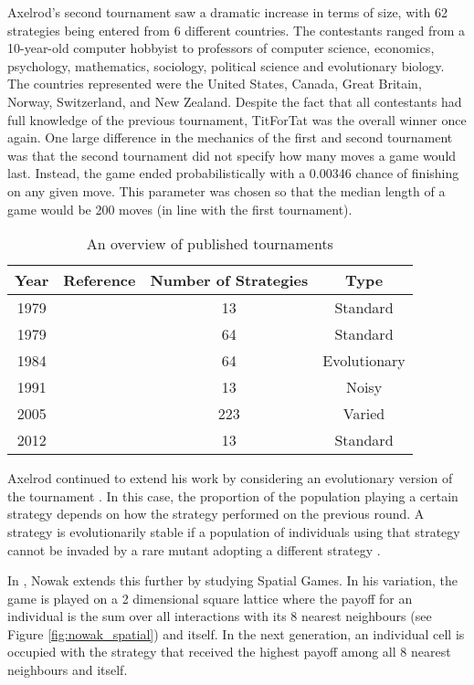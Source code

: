 Axelrod's second tournament \cite{Axelrod1980b} saw a dramatic increase in terms of size, with 62 strategies being entered from 6 different countries.
The contestants ranged from a 10-year-old computer hobbyist to professors of computer science, economics, psychology, mathematics, sociology, political science and evolutionary biology.
The countries represented were the United States, Canada, Great Britain, Norway, Switzerland, and New Zealand.
Despite the fact that all contestants had full knowledge of the previous tournament, TitForTat was the overall winner once again.
One large difference in the mechanics of the first and second tournament was that the second tournament did not specify how many moves a game would last.
Instead, the game ended probabilistically with a 0.00346 chance of finishing on any given move.
This parameter was chosen so that the median length of a game would be 200 moves (in line with the first tournament).

\begin{table}[htbp]
\centering
\begin{tabular}{c c c c}
\toprule
Year & Reference & Number of Strategies & Type\\
\midrule
1979 & \cite{Axelrod1980a} & 13 & Standard\\
1979 & \cite{Axelrod1980b} & 64 & Standard\\
1984 & \cite{Axelrod1981} & 64 & Evolutionary\\
1991 & \cite{Bendor1991} & 13 & Noisy\\
2005 & \cite{Chong2004} & 223 & Varied\\
2012 & \cite{Stewart2012} & 13 & Standard\\
\bottomrule
\end{tabular}
\label{tab:tournament_refs}
\caption{An overview of published tournaments}
\end{table}

Axelrod continued to extend his work by considering an evolutionary version of the tournament \cite{Axelrod1981, Axelrod1984}.
In this case, the proportion of the population playing a certain strategy depends on how the strategy performed on the previous round.
A strategy is evolutionarily stable if a population of individuals using that strategy cannot be invaded by a rare mutant adopting a different strategy \cite{Axelrod1981}.

In \cite{Nowak1992, Nowak1993, Nowak1994}, Nowak extends this further by studying Spatial Games.
In his variation, the game is played on a 2 dimensional square lattice where the payoff for an individual is the sum over all interactions with its 8 nearest neighbours (see Figure \ref{fig:nowak_spatial}) and itself.
In the next generation, an individual cell is occupied with the strategy that received the highest payoff among all 8 nearest neighbours and itself.

